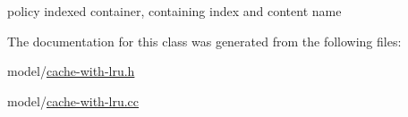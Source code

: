 policy indexed container, containing index and content name 



The documentation for this class was generated from the following files\-:\begin{DoxyCompactItemize}
\item 
model/\hyperlink{cache-with-lru_8h}{cache-\/with-\/lru.\-h}\item 
model/\hyperlink{cache-with-lru_8cc}{cache-\/with-\/lru.\-cc}\end{DoxyCompactItemize}
